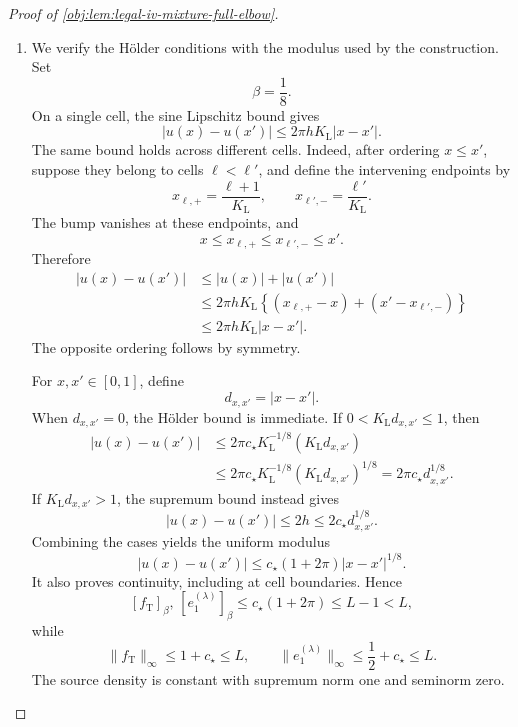 \begin{proof}[Proof of \cref{obj:lem:legal-iv-mixture-full-elbow}]
\begin{enumerate}
\item
We verify the Hölder conditions with the modulus used by the construction. Set
\[
\beta=\frac18.
\]
On a single cell, the sine Lipschitz bound gives
\[
|u(x)-u(x')|
\le 2\pi hK_{\mathrm L}|x-x'|.
\]
The same bound holds across different cells. Indeed, after ordering \(x\le x'\), suppose they belong to cells \(\ell<\ell'\), and define the intervening endpoints by
\[
x_{\ell,+}=\frac{\ell+1}{K_{\mathrm L}},
\qquad
x_{\ell',-}=\frac{\ell'}{K_{\mathrm L}}.
\]
The bump vanishes at these endpoints, and
\[
x\le x_{\ell,+}\le x_{\ell',-}\le x'.
\]
Therefore
\[
\begin{aligned}
|u(x)-u(x')|
&\le |u(x)|+|u(x')|\\
&\le 2\pi hK_{\mathrm L}
\left\{(x_{\ell,+}-x)+(x'-x_{\ell',-})\right\}\\
&\le 2\pi hK_{\mathrm L}|x-x'|.
\end{aligned}
\]
The opposite ordering follows by symmetry.

For \(x,x'\in[0,1]\), define
\[
d_{x,x'}=|x-x'|.
\]
When \(d_{x,x'}=0\), the Hölder bound is immediate. If
\(0<K_{\mathrm L}d_{x,x'}\le1\), then
\[
\begin{aligned}
|u(x)-u(x')|
&\le2\pi c_{\star}K_{\mathrm L}^{-1/8}
(K_{\mathrm L}d_{x,x'})\\
&\le2\pi c_{\star}K_{\mathrm L}^{-1/8}
(K_{\mathrm L}d_{x,x'})^{1/8}
=2\pi c_{\star}d_{x,x'}^{1/8}.
\end{aligned}
\]
If \(K_{\mathrm L}d_{x,x'}>1\), the supremum bound instead gives
\[
|u(x)-u(x')|
\le2h
\le2c_{\star}d_{x,x'}^{1/8}.
\]
Combining the cases yields the uniform modulus
\[
|u(x)-u(x')|
\le c_{\star}(1+2\pi)|x-x'|^{1/8}.
\]
It also proves continuity, including at cell boundaries. Hence
\[
[f_{\mathrm T}]_{\beta},\,[e_1^{(\lambda)}]_{\beta}
\le c_{\star}(1+2\pi)\le L-1<L,
\]
while
\[
\|f_{\mathrm T}\|_{\infty}\le1+c_{\star}\le L,
\qquad
\|e_1^{(\lambda)}\|_{\infty}\le\frac12+c_{\star}\le L.
\]
The source density is constant with supremum norm one and seminorm zero.


\end{enumerate}
\end{proof}
